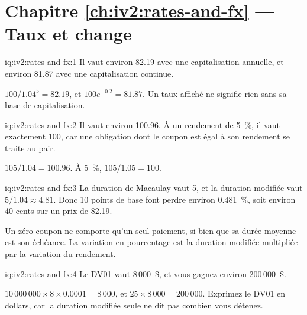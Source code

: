 \section*{Chapitre \ref{ch:iv2:rates-and-fx} --- Taux et change}

\begin{solution}{iq:iv2:rates-and-fx:1}
Il vaut environ 82.19 avec une capitalisation annuelle, et environ 81.87 avec une capitalisation continue.

$100/1.04^5 = 82.19$, et $100e^{-0.2} = 81.87$. Un taux affiché ne signifie rien sans sa base de capitalisation.

\end{solution}

\begin{solution}{iq:iv2:rates-and-fx:2}
Il vaut environ 100.96. À un rendement de 5~\%, il vaut exactement 100, car une obligation dont le coupon est égal à son rendement se traite au pair.

$105/1.04 = 100.96$. À 5~\%, $105/1.05 = 100$.

\end{solution}

\begin{solution}{iq:iv2:rates-and-fx:3}
La duration de Macaulay vaut 5, et la duration modifiée vaut $5/1.04 \approx 4.81$. Donc 10 points de base font perdre environ 0.481~\%, soit environ 40 cents sur un prix de 82.19.

Un zéro-coupon ne comporte qu'un seul paiement, si bien que sa durée moyenne est son échéance. La variation en pourcentage est la duration modifiée multipliée par la variation du rendement.

\end{solution}

\begin{solution}{iq:iv2:rates-and-fx:4}
Le DV01 vaut 8\,000~\$, et vous gagnez environ 200\,000~\$.

$10\,000\,000 \times 8 \times 0.0001 = 8\,000$, et $25 \times 8\,000 = 200\,000$. Exprimez le DV01 en dollars, car la duration modifiée seule ne dit pas combien vous détenez.

\end{solution}

